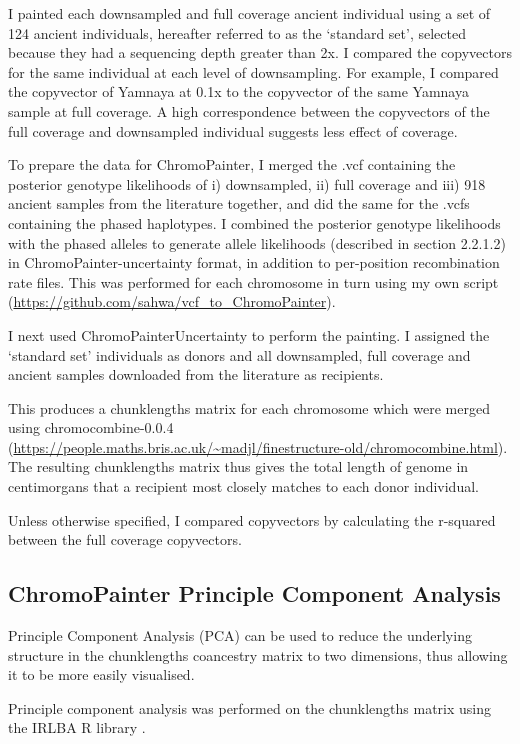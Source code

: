 I painted each downsampled and full coverage ancient individual using a set of 124 ancient individuals, hereafter referred to as the `standard set', selected because they had a sequencing depth greater than 2x. I compared the copyvectors for the same individual at each level of downsampling. For example, I compared the copyvector of Yamnaya at 0.1x to the copyvector of the same Yamnaya sample at full coverage. A high correspondence between the copyvectors of the full coverage and downsampled individual suggests less effect of coverage. 

To prepare the data for ChromoPainter, I merged the .vcf containing the posterior genotype likelihoods of i) downsampled, ii) full coverage and iii) 918 ancient samples from the literature together, and did the same for the .vcfs containing the phased haplotypes.  I combined the posterior genotype likelihoods with the phased alleles to generate allele likelihoods (described in section 2.2.1.2) in ChromoPainter-uncertainty format, in addition to per-position recombination rate files. This was performed for each chromosome in turn using my own script (\url{https://github.com/sahwa/vcf_to_ChromoPainter}).

I next used ChromoPainterUncertainty to perform the painting. I assigned the `standard set' individuals as donors and all downsampled, full coverage and ancient samples downloaded from the literature as recipients. 

This produces a chunklengths matrix for each chromosome which were merged using chromocombine-0.0.4 (\url{https://people.maths.bris.ac.uk/~madjl/finestructure-old/chromocombine.html}). The resulting chunklengths matrix thus gives the total length of genome in centimorgans that a recipient most closely matches to each donor individual. 

Unless otherwise specified, I compared copyvectors by calculating the r-squared between the full coverage copyvectors.

\subsection{ChromoPainter Principle Component Analysis}

Principle Component Analysis (PCA) can be used to reduce the underlying structure in the chunklengths coancestry matrix to two dimensions, thus allowing it to be more easily visualised. 

Principle component analysis was performed on the chunklengths matrix using the IRLBA R library \cite{baglama2005augmented}.

